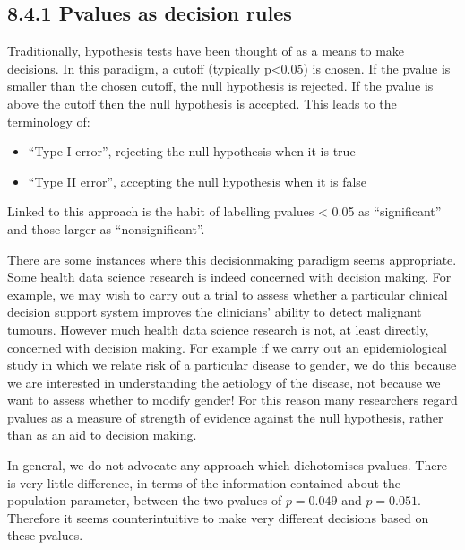\documentclass[letterpaper,10pt,english]{jupyterBook}
\begin{document}
\subsection{8.4.1 P\sphinxhyphen{}values as decision rules}
\label{\detokenize{08.e. Frequentist II:p-values-as-decision-rules}}
\sphinxAtStartPar
Traditionally, hypothesis tests have been thought of as a means to make decisions. In this paradigm, a cut\sphinxhyphen{}off (typically p<0.05) is chosen. If the p\sphinxhyphen{}value is smaller than the chosen cut\sphinxhyphen{}off, the null hypothesis is rejected. If the p\sphinxhyphen{}value is above the cut\sphinxhyphen{}off then the null hypothesis is accepted. This leads to the terminology of:
\begin{itemize}
\item {} 
\sphinxAtStartPar
“Type I error”, rejecting the null hypothesis when it is true

\item {} 
\sphinxAtStartPar
“Type II error”, accepting the null hypothesis when it is false

\end{itemize}

\sphinxAtStartPar
Linked to this approach is the habit of labelling p\sphinxhyphen{}values < 0.05 as “significant” and those larger as “non\sphinxhyphen{}significant”.

\sphinxAtStartPar
There are some instances where this decision\sphinxhyphen{}making paradigm seems appropriate. Some health data science research is indeed concerned with decision making. For example, we may wish to carry out a trial to assess whether a particular clinical decision support system improves the clinicians’ ability to detect malignant tumours. However much health data science research is not, at least directly, concerned with decision making. For example if we carry out an epidemiological study in which we relate risk of a particular disease to gender, we do this because we are interested in understanding the aetiology of the disease, not because we want to assess whether to modify gender! For this reason many researchers regard p\sphinxhyphen{}values as a measure of strength of evidence against the null hypothesis, rather than as an aid to decision
making.

\sphinxAtStartPar
In general, we do not advocate any approach which dichotomises p\sphinxhyphen{}values. There is very little difference, in terms of the information contained about the population parameter, between the two p\sphinxhyphen{}values of \(p=0.049\) and \(p=0.051\). Therefore it seems counter\sphinxhyphen{}intuitive to make very different decisions based on these p\sphinxhyphen{}values.
\end{document}
